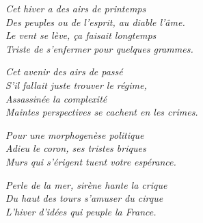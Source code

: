 



\vfill

\stars

{\raggedleft
\textit{
Cet hiver a des airs de printemps\\
Des peuples ou de l'esprit, au diable l'âme.\\
Le vent se lève, ça faisait longtemps\\
Triste de s'enfermer pour quelques grammes.\\
}
}
\medskip

{\raggedright

\textit{
Cet avenir des airs de passé\\
S'il fallait juste trouver le régime,\\
Assassinée la complexité\\
Maintes perspectives se cachent en les crimes.\\
}
}

\medskip
{\raggedleft

\textit{
Pour une morphogenèse politique\\
Adieu le coron, ses tristes briques\\
Murs qui s'érigent tuent votre espérance.\\
}
}

\medskip
{\raggedright


\textit{
Perle de la mer, sirène hante la crique\\
Du haut des tours s'amuser du cirque\\
L'hiver d'idées qui peuple la France.\\
}
}

\stars

\vfill






\newpage









